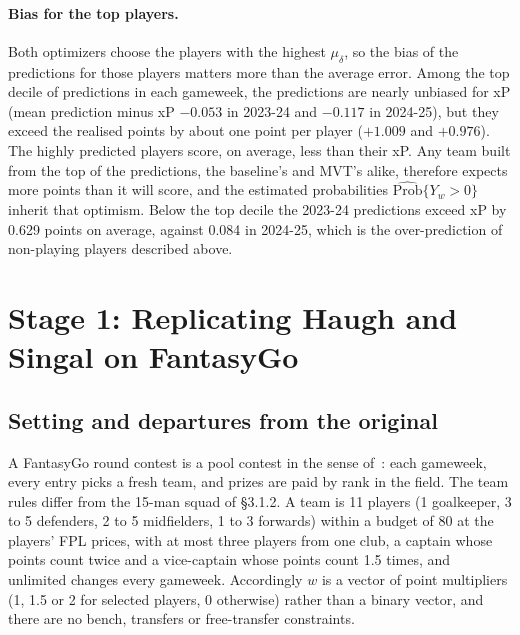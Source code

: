 \paragraph{Bias for the top players.} Both optimizers choose the players with the highest
$\mu_\delta$, so the bias of the predictions for those players matters more than the average
error. Among the top decile of predictions in each gameweek, the predictions are nearly unbiased
for xP (mean prediction minus xP $-0.053$ in 2023-24 and $-0.117$ in 2024-25), but they exceed
the realised points by about one point per player ($+1.009$ and $+0.976$). The highly predicted
players score, on average, less than their xP. Any team built from the top of the predictions,
the baseline's and MVT's alike, therefore expects more points than it will score, and the
estimated probabilities $\widehat{\mathrm{Prob}}\{Y_w>0\}$ inherit that optimism. Below the top
decile the 2023-24 predictions exceed xP by 0.629 points on average, against 0.084 in 2024-25,
which is the over-prediction of non-playing players described above.

\section{Stage 1: Replicating Haugh and Singal on FantasyGo}
\label{sec:s1}

\subsection{Setting and departures from the original}
\label{sec:s1-setting}

A FantasyGo round contest is a pool contest in the sense of~\cite{haugh2021}: each gameweek,
every entry picks a fresh team, and prizes are paid by rank in the field. The team rules differ
from the 15-man squad of §3.1.2. A team is 11 players (1 goalkeeper, 3 to 5 defenders, 2 to 5
midfielders, 1 to 3 forwards) within a budget of 80 at the players' FPL prices, with at most
three players from one club, a captain whose points count twice and a vice-captain whose points
count 1.5 times, and unlimited changes every gameweek. Accordingly $w$ is a vector of point
multipliers (1, 1.5 or 2 for selected players, 0 otherwise) rather than a binary vector, and
there are no bench, transfers or free-transfer constraints.

